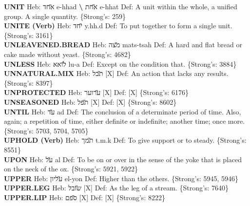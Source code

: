 {\textbf{UNIT} Heb: {\large\H אחד} e-hhad \textbf{\textbackslash{}} {\large\H אחת} e-hhat Def: A unit within the whole, a unified group. A single quantity. \{Strong's: 259\}\hfill{}\\

\textbf{UNITE (Verb)} Heb: {\large\H יחד} y.hh.d Def: To put together to form a single unit. \{Strong's: 3161\}\hfill{}\\

\textbf{UNLEAVENED.BREAD} Heb: {\large\H מצה} mats-tsah Def: A hard and flat bread or cake made without yeast. \{Strong's: 4682\}\hfill{}\\

\textbf{UNLESS} Heb: {\large\H לואא} lu-a Def: Except on the condition that. \{Strong's: 3884\}\hfill{}\\

\textbf{UNNATURAL.MIX} Heb: {\large\H תבל} {[}X{]} Def: An action that lacks any results. \{Strong's: 8397\}\hfill{}\\

\textbf{UNPROTECTED} Heb: {\large\H ערוער} {[}X{]} Def: {[}X{]} \{Strong's: 6176\}\hfill{}\\

\textbf{UNSEASONED} Heb: {\large\H תפל} {[}X{]} Def: {[}X{]} \{Strong's: 8602\}\hfill{}\\

\textbf{UNTIL} Heb: {\large\H עד} ad Def: The conclusion of a determinate period of time. Also, again; a repetition of time, either definite or indefinite; another time; once more. \{Strong's: 5703, 5704, 5705\}\hfill{}\\

\textbf{UPHOLD (Verb)} Heb: {\large\H תמך} t.m.k Def: To give support or to steady. \{Strong's: 8551\}\hfill{}\\

\textbf{UPON} Heb: {\large\H על} al Def: To be on or over in the sense of the yoke that is placed on the neck of the ox. \{Strong's: 5921, 5922\}\hfill{}\\

\textbf{UPPER} Heb: {\large\H עליון} el-yon Def: Higher than the others. \{Strong's: 5945, 5946\}\hfill{}\\

\textbf{UPPER.LEG} Heb: {\large\H שובל} {[}X{]} Def: As the leg of a stream. \{Strong's: 7640\}\hfill{}\\

\textbf{UPPER.LIP} Heb: {\large\H ספם} {[}X{]} Def: {[}X{]} \{Strong's: 8222\}\hfill{}\\

}

